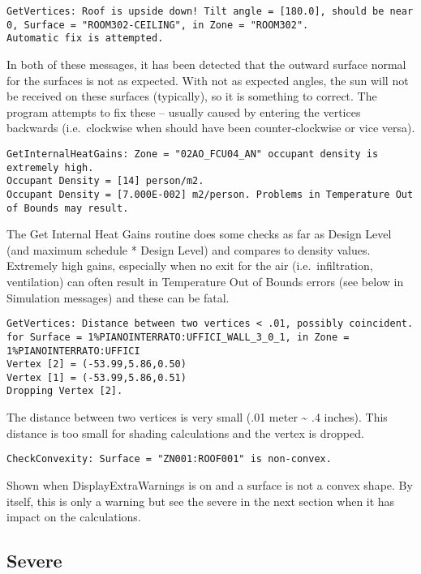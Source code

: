 \begin{lstlisting}
GetVertices: Roof is upside down! Tilt angle = [180.0], should be near 0, Surface = "ROOM302-CEILING", in Zone = "ROOM302".
Automatic fix is attempted.
\end{lstlisting}

In both of these messages, it has been detected that the outward surface normal for the surfaces is not as expected. With not as expected angles, the sun will not be received on these surfaces (typically), so it is something to correct. The program attempts to fix these -- usually caused by entering the vertices backwards (i.e.~clockwise when should have been counter-clockwise or vice versa).

\begin{lstlisting}
GetInternalHeatGains: Zone = "02AO_FCU04_AN" occupant density is extremely high.
Occupant Density = [14] person/m2.
Occupant Density = [7.000E-002] m2/person. Problems in Temperature Out of Bounds may result.
\end{lstlisting}

The Get Internal Heat Gains routine does some checks as far as Design Level (and maximum schedule * Design Level) and compares to density values. Extremely high gains, especially when no exit for the air (i.e.~infiltration, ventilation) can often result in Temperature Out of Bounds errors (see below in Simulation messages) and these can be fatal.

\begin{lstlisting}
GetVertices: Distance between two vertices < .01, possibly coincident. for Surface = 1%PIANOINTERRATO:UFFICI_WALL_3_0_1, in Zone = 1%PIANOINTERRATO:UFFICI
Vertex [2] = (-53.99,5.86,0.50)
Vertex [1] = (-53.99,5.86,0.51)
Dropping Vertex [2].
\end{lstlisting}

The distance between two vertices is very small (.01 meter \textasciitilde{} .4 inches). This distance is too small for shading calculations and the vertex is dropped.

\begin{lstlisting}
CheckConvexity: Surface = "ZN001:ROOF001" is non-convex.
\end{lstlisting}

Shown when DisplayExtraWarnings is on and a surface is not a convex shape. By itself, this is only a warning but see the severe in the next section when it has impact on the calculations.

\subsection{Severe}\label{severe-002}

